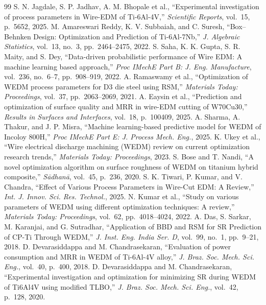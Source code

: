 \documentclass[12pt, a4paper]{report}
\begin{document}
\begin{thebibliography}{99}
 S. N. Jagdale, S. P. Jadhav, A. M. Bhopale et al., ``Experimental investigation of process parameters in Wire-EDM of Ti-6Al-4V,'' \textit{Scientific Reports}, vol.~15, p.~5652, 2025.
 M. Amareswari Reddy, K. V. Subbaiah, and C. Suresh, ``Box--Behnken Design: Optimization and Prediction of Ti-6Al-7Nb,'' \textit{J. Algebraic Statistics}, vol.~13, no.~3, pp.~2464--2475, 2022.
 S. Saha, K. K. Gupta, S. R. Maity, and S. Dey, ``Data-driven probabilistic performance of Wire EDM: A machine learning based approach,'' \textit{Proc IMechE Part B: J. Eng. Manufacture}, vol.~236, no.~6--7, pp.~908--919, 2022.
 A. Ramaswamy et al., ``Optimization of WEDM process parameters for D3 die steel using RSM,'' \textit{Materials Today: Proceedings}, vol.~37, pp.~2063--2069, 2021.
 A. Eaysin et al., ``Prediction and optimization of surface quality and MRR in wire-EDM cutting of W70Cu30,'' \textit{Results in Surfaces and Interfaces}, vol.~18, p.~100409, 2025.
 A. Sharma, A. Thakur, and J. P. Misra, ``Machine learning-based predictive model for WEDM of Incoloy 800H,'' \textit{Proc IMechE Part E: J. Process Mech. Eng.}, 2025.
 K. Ukey et al., ``Wire electrical discharge machining (WEDM) review on current optimization research trends,'' \textit{Materials Today: Proceedings}, 2023.
 S. Bose and T. Nandi, ``A novel optimization algorithm on surface roughness of WEDM on titanium hybrid composite,'' \textit{S\=adhan\=a}, vol.~45, p.~236, 2020.
 S. K. Tiwari, P. Kumar, and V. Chandra, ``Effect of Various Process Parameters in Wire-Cut EDM: A Review,'' \textit{Int. J. Innov. Sci. Res. Technol.}, 2025.
 N. Kumar et al., ``Study on various parameters of WEDM using different optimization techniques: A review,'' \textit{Materials Today: Proceedings}, vol.~62, pp.~4018--4024, 2022.
 A. Das, S. Sarkar, M. Karanjai, and G. Sutradhar, ``Application of BBD and RSM for SR Prediction of CP-Ti Through WEDM,'' \textit{J. Inst. Eng. India Ser. D}, vol.~99, no.~1, pp.~9--21, 2018.
 D. Devarasiddappa and M. Chandrasekaran, ``Evaluation of power consumption and MRR in WEDM of Ti-6Al-4V alloy,'' \textit{J. Braz. Soc. Mech. Sci. Eng.}, vol.~40, p.~400, 2018.
 D. Devarasiddappa and M. Chandrasekaran, ``Experimental investigation and optimization for minimizing SR during WEDM of Ti6Al4V using modified TLBO,'' \textit{J. Braz. Soc. Mech. Sci. Eng.}, vol.~42, p.~128, 2020.

\end{thebibliography}
\end{document}
